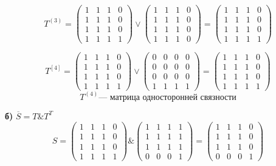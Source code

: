 \documentclass[14pt]{extarticle}
\begin{document}
\[
T^{(3)} = \begin{pmatrix}
1 & 1 & 1 & 0 \\
1 & 1 & 1 & 0 \\
1 & 1 & 1 & 0 \\
1 & 1 & 1 & 1
\end{pmatrix}
\lor
\begin{pmatrix}
1 & 1 & 1 & 0 \\
1 & 1 & 1 & 0 \\
1 & 1 & 1 & 0 \\
1 & 1 & 1 & 0
\end{pmatrix}
=
\begin{pmatrix}
1 & 1 & 1 & 0 \\
1 & 1 & 1 & 0 \\
1 & 1 & 1 & 0 \\
1 & 1 & 1 & 1
\end{pmatrix}
\]

\[
T^{[4]} = \begin{pmatrix}
1 & 1 & 1 & 0 \\
1 & 1 & 1 & 0 \\
1 & 1 & 1 & 0 \\
1 & 1 & 1 & 1
\end{pmatrix}
\lor
\begin{pmatrix}
0 & 0 & 0 & 0 \\
0 & 0 & 0 & 0 \\
0 & 0 & 0 & 0 \\
1 & 1 & 1 & 1
\end{pmatrix}
=
\begin{pmatrix}
1 & 1 & 1 & 0 \\
1 & 1 & 1 & 0 \\
1 & 1 & 1 & 0 \\
1 & 1 & 1 & 1
\end{pmatrix}
\]
\[
T^{(4)} \text{--- матрица односторонней связности}
\]

\textbf{б)} \( \overline{S} = T \& T^T \)
\[
S = \begin{pmatrix}
1 & 1 & 1 & 0 \\
1 & 1 & 1 & 0 \\ 
1 & 1 & 1 & 0 \\
1 & 1 & 1 & 1
\end{pmatrix} \& \begin{pmatrix}
1 & 1 & 1 & 1 \\
1 & 1 & 1 & 1 \\
1 & 1 & 1 & 1 \\
0 & 0 & 0 & 1
\end{pmatrix} = \begin{pmatrix}
1 & 1 & 1 & 0 \\
1 & 1 & 1 & 0 \\
1 & 1 & 1 & 0 \\
0 & 0 & 0 & 1
\end{pmatrix}
\]
\end{document}
